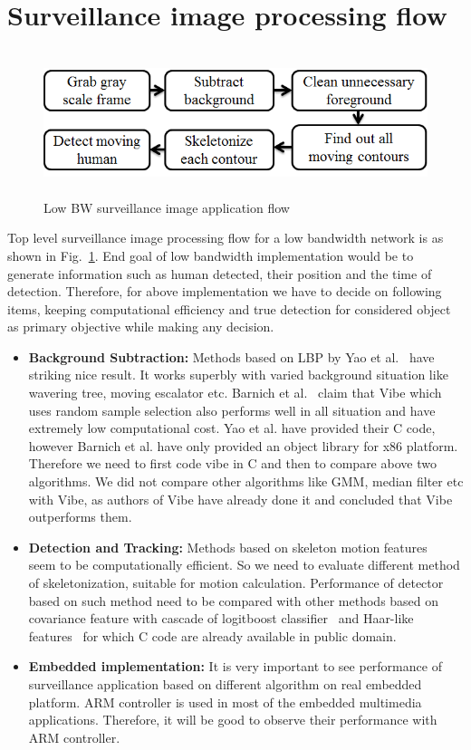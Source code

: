 \section{Surveillance image processing flow}
\begin{figure}[!b]
\centering
\includegraphics[height=120pt]{Figures/image_pipeline}
\caption{Low BW surveillance image application flow}
\label{image_pipeline}
\end{figure}
\indent Top level surveillance image processing flow for a low bandwidth
network is as shown in Fig.~\ref{image_pipeline}. End goal of low
bandwidth implementation would be to generate information such as human
detected, their position and the time of detection. Therefore, for above
implementation we have to decide on following items, keeping
computational efficiency and true detection for considered object as
primary objective while making any decision.\\
\begin{itemize}
\item \textbf{Background Subtraction:} Methods based on LBP by Yao et
	al.~\cite{11} have striking nice result. It works superbly with
	varied background situation like wavering tree, moving escalator
	etc. Barnich et al.~\cite{9} claim that Vibe which uses random
	sample selection also performs well in all situation and have
	extremely low computational cost. Yao et al. have provided their
	C code, however Barnich et al. have only provided an object
	library for x86 platform. Therefore we need to first code vibe
	in C and then to compare above two algorithms. We did not
	compare other algorithms like GMM, median filter etc with Vibe,
	as authors of Vibe have already done it and concluded that Vibe
	outperforms them.
\item \textbf{Detection and Tracking:} Methods based on skeleton motion
	features~\cite{32, 22, 31} seem to be computationally
	efficient. So we need to evaluate different method of
	skeletonization, suitable for motion calculation. Performance of
	detector based on such method need to be compared with other
	methods based on covariance feature with cascade of logitboost
	classifier~\cite{19}  and Haar-like features~\cite{17} for
	which C code are already available in public domain.
\item \textbf{Embedded implementation:} It is very important to see
	performance of surveillance application based on different
	algorithm on real embedded platform. ARM controller is used in
	most of the embedded multimedia applications. Therefore, it will be
	good to observe their performance with ARM controller.
\end{itemize}
